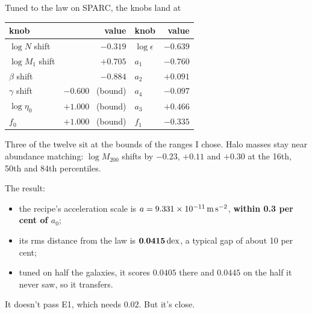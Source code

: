 

Tuned to the law on SPARC, the knobs land at
\begin{center}\small
\begin{tabular}{@{}lrlr@{}}
\toprule
knob & value & knob & value\\
\midrule
$\log N$ shift & $-0.319$ & $\log\epsilon$ & $-0.639$\\
$\log M_1$ shift & $+0.705$ & $a_1$ & $-0.760$\\
$\beta$ shift & $-0.884$ & $a_2$ & $+0.091$\\
$\gamma$ shift & $-0.600$ \ (bound) & $a_4$ & $-0.097$\\
$\log\eta_0$ & $+1.000$ \ (bound) & $a_3$ & $+0.466$\\
$f_0$ & $+1.000$ \ (bound) & $f_1$ & $-0.335$\\
\bottomrule
\end{tabular}
\end{center}
Three of the twelve sit at the bounds of the ranges I chose. Halo masses stay near abundance matching: $\log M_{200}$ shifts by $-0.23$, $+0.11$ and $+0.30$ at the 16th, 50th and 84th percentiles.



The result:
\begin{itemize}
\item the recipe's acceleration scale is $a=9.331\times10^{-11}\,\mathrm{m\,s^{-2}}$, \textbf{within 0.3 per cent of $a_0$};
\item its rms distance from the law is $\mathbf{0.0415\,\mathrm{dex}}$, a typical gap of about 10 per cent;
\item tuned on half the galaxies, it scores $0.0405$ there and $0.0445$ on the half it never saw, so it transfers.
\end{itemize}
It doesn't pass E1, which needs $0.02$. But it's close.




